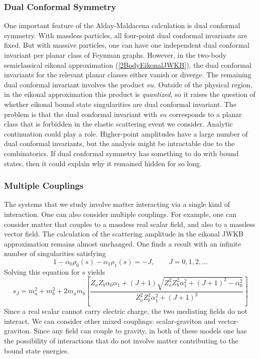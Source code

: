 \subsubsection*{Dual Conformal Symmetry}
One important feature of the Alday-Maldacena calculation is dual conformal symmetry. With massless particles, all four-point dual conformal invariants are fixed. But with massive particles, one can have one independent dual conformal invariant per planar class of Feynman graphs. However, in the two-body semiclassical eikonal approximation (\ref{2BodyEikonalJWKB}), the dual conformal invariants for the relevant planar classes either vanish or diverge. The remaining dual conformal invariant involves the product $su$. Outside of the physical region, in the eikonal approximation this product is \textit{quantized}, so it raises the question of whether eikonal bound state singularities are dual conformal invariant. The problem is that the dual conformal invariant with $s u$ corresponds to a planar class that is forbidden in the elastic scattering event we consider. Analytic continuation could play a role. Higher-point amplitudes have a large number of dual conformal invariants, but the analysis might be intractable due to the combinatorics. If dual conformal symmetry has something to do with bound states, then it could explain why it remained hidden for so long.
\subsubsection*{Multiple Couplings}
The systems that we study involve matter interacting via a single kind of interaction. One can also consider multiple couplings. For example, one can consider matter that couples to a massless real scalar field, and also to a massless vector field. The calculation of the scattering amplitude in the eikonal JWKB approximation remains almost unchanged. One finds a result with an infinite number of singularities satisfying
\begin{equation}
	1 - \alpha_{0} \rho_{0}(s) - \alpha_{1} \rho_{1}(s) = -J, \qquad J = 0, 1, 2, \ldots
\end{equation}
Solving this equation for $s$ yields
\begin{equation}
	s_{J} = m_{a}^{2} + m_{b}^{2} + 2 m_{a} m_{b} \left[ \frac{Z_{a} Z_{b} \alpha_{0} \alpha_{1} + (J+1) \sqrt{Z_{a}^{2} Z_{b}^{2} \alpha_{1}^{2} + (J+1)^{2} - \alpha_{0}^{2}}}{Z_{a}^{2} Z_{b}^{2} \alpha_{1}^{2} + (J+1)^{2}} \right] \nonumber
\end{equation}
Since a real scalar cannot carry electric charge, the two mediating fields do not interact. We can consider other mixed couplings: scalar-graviton and vector-graviton. Since any field can couple to gravity, in both of these models one has the possibility of interactions that do not involve matter contributing to the bound state energies.%
